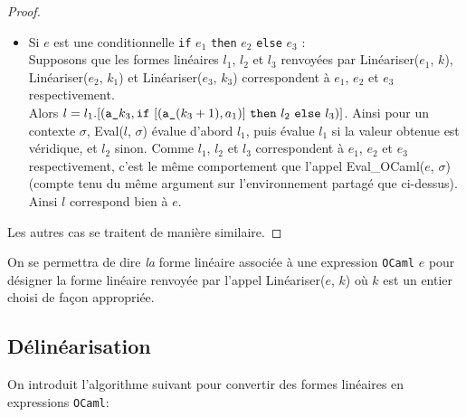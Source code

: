 \begin{proof}
\begin{itemize}
        \item Si $e$ est une conditionnelle \texttt{if} $e_1$ \texttt{then} $e_2$ \texttt{else} $e_3$ : \\
              Supposons que les formes linéaires $l_1$, $l_2$ et $l_3$ renvoyées
              par Linéariser($e_1$, $k$), Linéariser($e_2$, $k_1$) et
              Linéariser($e_3$, $k_3$) correspondent à $e_1$, $e_2$ et $e_3$
              respectivement. \\
              Alors $l = l_1.[(\texttt{a\_}k_3, \textnormal{\texttt{if}}\ [(\texttt{a\_}(k_3 + 1), a_1)]\ \textnormal{\texttt{then}}\ l_2\ \textnormal{\texttt{else}}\ l_3)]$.
              Ainsi pour un contexte $\sigma$, Eval($l$, $\sigma$) évalue
              d'abord $l_1$, puis évalue $l_1$ si la valeur obtenue est
              véridique, et $l_2$ sinon. Comme $l_1$, $l_2$ et $l_3$
              correspondent à $e_1$, $e_2$ et $e_3$ respectivement, c'est le
              même comportement que l'appel Eval\_OCaml($e$, $\sigma$) (compte
              tenu du même argument sur l'environnement partagé que ci-dessus).
              Ainsi $l$ correspond bien à $e$.
    \end{itemize}
    Les autres cas se traitent de manière similaire.
\end{proof}

\begin{remark}
    On se permettra de dire \textit{la} forme linéaire associée à une
    expression \texttt{OCaml} $e$ pour désigner la forme linéaire renvoyée
    par l'appel Linéariser($e$, $k$) o\`u $k$ est un entier choisi de façon
    appropriée.
\end{remark}

\subsection{Délinéarisation}

On introduit l'algorithme suivant pour convertir des formes linéaires en
expressions \texttt{OCaml}:

